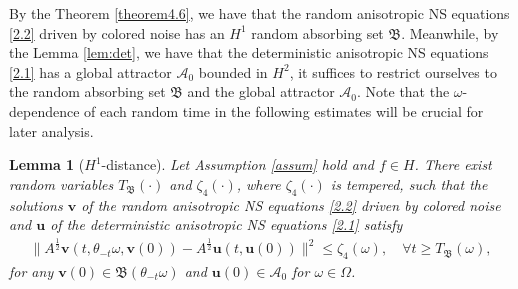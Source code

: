 \documentclass{elsarticle}
\newtheorem{lemma}[theorem]{Lemma}
\theoremstyle{definition}
\numberwithin{equation}{section}
\begin{document}
By the Theorem \ref{theorem4.6},  we have that the random anisotropic NS equations  \eqref{2.2} driven by colored noise  has an $H^1$ random absorbing set $\mathfrak B$. Meanwhile, by the Lemma \ref{lem:det},  we have that  the deterministic anisotropic NS equations  \eqref{2.1} has a global attractor $\mathcal A_0$ bounded in $H^2$, it suffices to restrict ourselves to the random absorbing set  $\mathfrak B$ and the  global attractor $\mathcal A_0$. Note that    the $\omega$-dependence  of each  random time in the following estimates will be crucial for later analysis.

\begin{lemma}[$H^1$-distance]
\label{lemma4.3}
 Let Assumption \ref{assum} hold and $f\in H$. There   exist   random variables $T_{\mathfrak B}(\cdot)$ and    $\zeta_4(\cdot)$, where  $\zeta_4(\cdot)$ is tempered,  such that the solutions $\textbf{v}$  of the random  anisotropic NS equations \eqref{2.2} driven by colored noise and $\textbf{u}$  of the deterministic anisotropic NS equations  \eqref{2.1} satisfy
\begin{align}
 \big \|A^{\frac 12} \textbf{v}(t,\theta_{-t}\omega,\textbf{v}(0))-A^{\frac 12} \textbf{u}(t,\textbf{u}(0)) \big\| ^2 \leq \zeta_4(\omega),\quad \forall t\geq T_{\mathfrak B}(\omega), \nonumber
\end{align}
for any $\textbf{v}(0)\in\mathfrak{B}(\theta_{-t}\omega)$
 and $\textbf{u}(0)\in\mathcal{A}_0$ for $\omega\in \Omega$.
\end{lemma}
\end{document}
